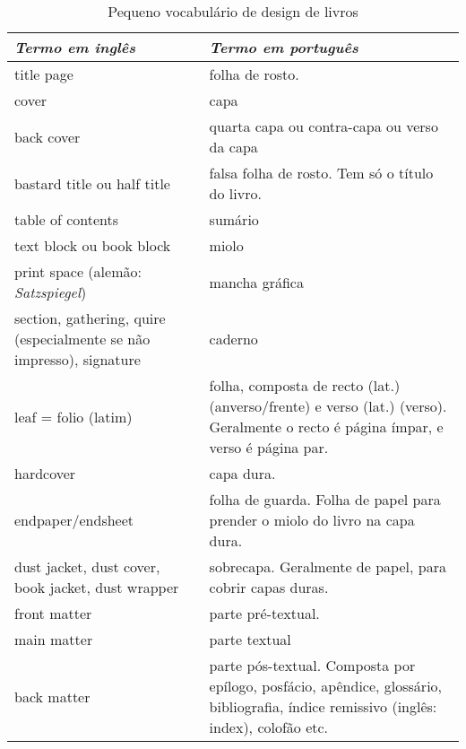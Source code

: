\begin{table}
	\caption{Pequeno vocabulário de design de livros\label{vocabulario-texto}}
	\ABNTEXfontereduzida
	\begin{tabular}{p{4cm}p{4cm}}
		\toprule
		\textit{Termo em inglês} & \textit{Termo em português}\\
		\midrule
		\ABNTEXfontereduzida
		title page & folha de rosto.\\
		
		cover & capa\\
		
		back cover & quarta capa ou contra-capa ou verso da capa\\
		
		bastard title ou half title & falsa folha de rosto. Tem só o título do livro.\\
		
		table of contents & sumário\\
		
		text block ou book block & miolo\\
		
		print space (alemão: \textit{Satzspiegel}) & mancha gráfica\\
		
		section, gathering, quire (especialmente se não impresso), signature & caderno\\
		
		leaf = folio (latim) & folha, composta de recto (lat.) (anverso/frente) e verso (lat.) (verso). Geralmente o recto é página ímpar, e verso é página par.\\
		
		hardcover & capa dura.\\
		
		endpaper/endsheet & folha de guarda. Folha de papel para prender o miolo do livro na capa dura.\\
		
		dust jacket, dust cover, book jacket, dust wrapper & sobrecapa. Geralmente de papel, para cobrir capas duras.\\
		
		front matter & parte pré-textual.\\
		
		main matter & parte textual\\
		
		back matter & parte pós-textual. Composta por epílogo, posfácio, apêndice, glossário, bibliografia, índice remissivo (inglês: index), colofão etc.\\
		

\end{tabular}
\end{table}
